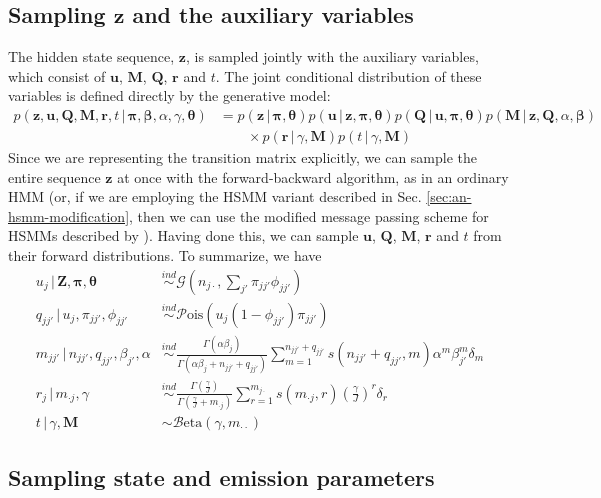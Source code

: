 \documentclass[12pt,letterpaper]{report}
\newcommand{\Pois}[1]{\mathcal{P}\mathrm{ois}(#1)}
\newcommand{\Gamm}[2]{\mathcal{G}(#1,#2)}
\newcommand{\Beta}[2]{\mathcal{B}\mathrm{eta}(#1,#2)}
\newcommand{\given}{\, \vert \,}
\newcommand{\bM}{\mathbf{M}}
\newcommand{\bQ}{\mathbf{Q}}
\newcommand{\bz}{\mathbf{z}}
\newcommand{\bZ}{\mathbf{Z}}
\newcommand{\bu}{\mathbf{u}}
\newcommand{\br}{\mathbf{r}}
\newcommand{\bbeta}{\boldsymbol{\beta}}
\newcommand{\btheta}{\boldsymbol{\theta}}
\newcommand{\bpi}{\boldsymbol{\pi}}
\begin{document}
\subsection{Sampling $\bz$ and the auxiliary variables}
\label{sec:sampling-z_t}

The hidden state sequence, $\bz$, is sampled jointly with the auxiliary
variables, which consist of $\bu$, $\bM$, $\bQ$, $\br$ and $t$.  The
joint conditional distribution of these variables is defined directly
by the generative model:
\begin{align}
  \label{eq:19}
  p(\bz, \bu, \bQ, \bM, \br, t \given \bpi, \bbeta, \alpha, \gamma,
  \btheta) &= p(\bz \given \bpi, \btheta) p(\bu \given \bz, \bpi, \btheta) p(\bQ \given
  \bu, \bpi, \btheta) p(\bM \given
  \bz, \bQ, \alpha, \bbeta) \\
  &\qquad \times p(\br \given
  \gamma, \bM) p(t \given \gamma, \bM)
\end{align}
Since we are representing the transition matrix explicitly, we can
sample the entire sequence $\bz$ at once with the forward-backward algorithm,
as in an ordinary HMM (or, if we are employing the HSMM variant
described in Sec. \ref{sec:an-hsmm-modification}, then we can use the
modified message passing scheme for HSMMs described by
\citet{johnson2013bayesian}).  
Having done this, we can sample $\bu$, $\bQ$, $\bM$,
$\br$ and $t$ from their forward distributions.  To summarize,
we have
\begin{align}
  \label{eq:48}
  u_j \given \bZ, \bpi, \btheta &\stackrel{ind}{\sim}
  \Gamm{n_{j\cdot}}{\sum_{j'} \pi_{jj'}\phi_{jj'}} \\
  q_{jj'} \given u_j, \pi_{jj'}, \phi_{jj'} &\stackrel{ind}{\sim}
  \Pois{u_j(1 - \phi_{jj'})\pi_{jj'}} \\
  m_{jj'} \given n_{jj'}, q_{jj'}, \beta_{j'}, \alpha &\stackrel{ind}{\sim}
  \frac{\Gamma(\alpha\beta_j)}{\Gamma(\alpha\beta_j + n_{jj'} +
    q_{jj'})}\sum_{m=1}^{n_{jj'} + q_{jj'}} s(n_{jj'} + q_{jj'}, m) \alpha^m \beta_{j'}^m \delta_{m}
  \\
  r_j \given m_{\cdot j}, \gamma &\stackrel{ind}{\sim}
  \frac{\Gamma(\frac{\gamma}{J})}{\Gamma(\frac{\gamma}{J} + m_{\cdot
      j})} \sum_{r=1}^{m_{j\cdot}} s(m_{\cdot j}, r)
  \left(\frac{\gamma}{J}\right)^r \delta_r \\
  t \given \gamma, \bM &\sim \Beta{\gamma}{m_{\cdot\cdot}}
\end{align}

\subsection{Sampling state and emission parameters}
\label{sec:sampling-eta}
\end{document}
